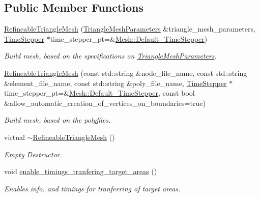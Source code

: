 \subsection*{Public Member Functions}
\begin{DoxyCompactItemize}
\item 
\hyperlink{classoomph_1_1RefineableTriangleMesh_a8285dea563df94b4e450e283088da6d6}{Refineable\+Triangle\+Mesh} (\hyperlink{classoomph_1_1TriangleMeshParameters}{Triangle\+Mesh\+Parameters} \&triangle\+\_\+mesh\+\_\+parameters, \hyperlink{classoomph_1_1TimeStepper}{Time\+Stepper} $\ast$time\+\_\+stepper\+\_\+pt=\&\hyperlink{classoomph_1_1Mesh_a12243d0fee2b1fcee729ee5a4777ea10}{Mesh\+::\+Default\+\_\+\+Time\+Stepper})
\begin{DoxyCompactList}\small\item\em Build mesh, based on the specifications on \hyperlink{classoomph_1_1TriangleMeshParameters}{Triangle\+Mesh\+Parameters}. \end{DoxyCompactList}\item 
\hyperlink{classoomph_1_1RefineableTriangleMesh_a72c24c96f89006c905551b650db29cc7}{Refineable\+Triangle\+Mesh} (const std\+::string \&node\+\_\+file\+\_\+name, const std\+::string \&element\+\_\+file\+\_\+name, const std\+::string \&poly\+\_\+file\+\_\+name, \hyperlink{classoomph_1_1TimeStepper}{Time\+Stepper} $\ast$time\+\_\+stepper\+\_\+pt=\&\hyperlink{classoomph_1_1Mesh_a12243d0fee2b1fcee729ee5a4777ea10}{Mesh\+::\+Default\+\_\+\+Time\+Stepper}, const bool \&allow\+\_\+automatic\+\_\+creation\+\_\+of\+\_\+vertices\+\_\+on\+\_\+boundaries=true)
\begin{DoxyCompactList}\small\item\em Build mesh, based on the polyfiles. \end{DoxyCompactList}\item 
virtual \hyperlink{classoomph_1_1RefineableTriangleMesh_a1b8b8e3142e215013533c6ee14c5484e}{$\sim$\+Refineable\+Triangle\+Mesh} ()
\begin{DoxyCompactList}\small\item\em Empty Destructor. \end{DoxyCompactList}\item 
void \hyperlink{classoomph_1_1RefineableTriangleMesh_a0f961b7194d4ee2fc4fc5677a46cdb1c}{enable\+\_\+timings\+\_\+tranfering\+\_\+target\+\_\+areas} ()
\begin{DoxyCompactList}\small\item\em Enables info. and timings for tranferring of target areas. \end{DoxyCompactList}\item 

\end{DoxyCompactItemize}

